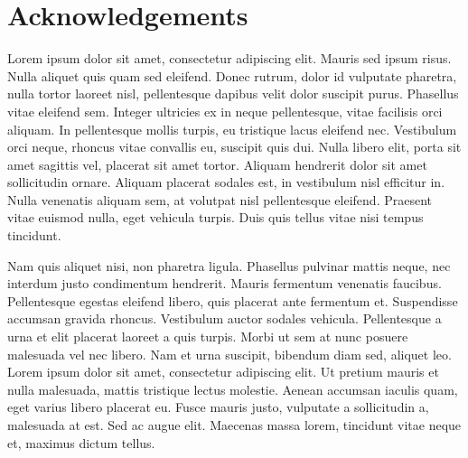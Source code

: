 \chapter*{Acknowledgements}

Lorem ipsum dolor sit amet, consectetur adipiscing elit.
Mauris sed ipsum risus.
Nulla aliquet quis quam sed eleifend.
Donec rutrum, dolor id vulputate pharetra, nulla tortor laoreet nisl,
pellentesque dapibus velit dolor suscipit purus.
Phasellus vitae eleifend sem.
Integer ultricies ex in neque pellentesque, vitae facilisis orci aliquam.
In pellentesque mollis turpis, eu tristique lacus eleifend nec.
Vestibulum orci neque, rhoncus vitae convallis eu, suscipit quis dui.
Nulla libero elit, porta sit amet sagittis vel, placerat sit amet tortor.
Aliquam hendrerit dolor sit amet sollicitudin ornare.
Aliquam placerat sodales est, in vestibulum nisl efficitur in.
Nulla venenatis aliquam sem, at volutpat nisl pellentesque eleifend.
Praesent vitae euismod nulla, eget vehicula turpis.
Duis quis tellus vitae nisi tempus tincidunt.

Nam quis aliquet nisi, non pharetra ligula.
Phasellus pulvinar mattis neque, nec interdum justo condimentum hendrerit.
Mauris fermentum venenatis faucibus.
Pellentesque egestas eleifend libero, quis placerat ante fermentum et.
Suspendisse accumsan gravida rhoncus.
Vestibulum auctor sodales vehicula.
Pellentesque a urna et elit placerat laoreet a quis turpis.
Morbi ut sem at nunc posuere malesuada vel nec libero.
Nam et urna suscipit, bibendum diam sed, aliquet leo.
Lorem ipsum dolor sit amet, consectetur adipiscing elit.
Ut pretium mauris et nulla malesuada, mattis tristique lectus molestie.
Aenean accumsan iaculis quam, eget varius libero placerat eu.
Fusce mauris justo, vulputate a sollicitudin a, malesuada at est.
Sed ac augue elit.
Maecenas massa lorem, tincidunt vitae neque et, maximus dictum tellus.
